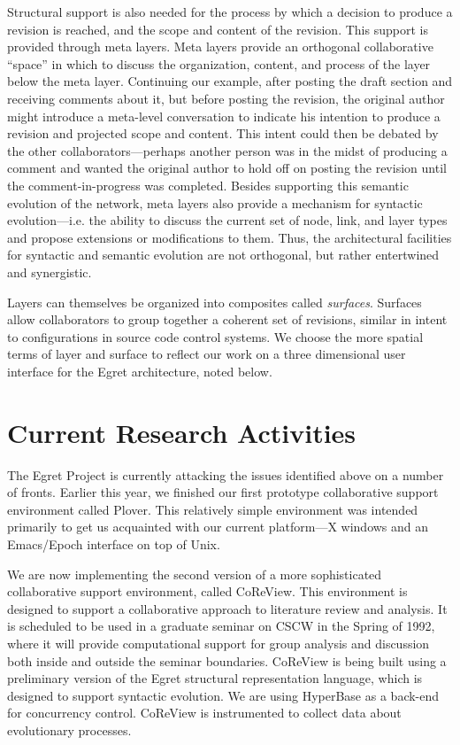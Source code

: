 Structural support is also needed for the process by which a decision
to produce a revision is reached, and the scope and content of the
revision.  This support is provided through meta layers.  Meta layers
provide an orthogonal collaborative ``space'' in which to discuss the
organization, content, and process of the layer below the meta layer.
Continuing our example, after posting the draft section and receiving
comments about it, but before posting the revision, the original
author might introduce a meta-level conversation to indicate his
intention to produce a revision and projected scope and content.  This
intent could then be debated by the other collaborators---perhaps
another person was in the midst of producing a comment and wanted the
original author to hold off on posting the revision until the
comment-in-progress was completed.  Besides supporting this semantic
evolution of the network, meta layers also provide a mechanism for
syntactic evolution---i.e. the ability to discuss the current set of
node, link, and layer types and propose extensions or modifications to
them.  Thus, the architectural facilities for syntactic and semantic
evolution are not orthogonal, but rather entertwined and synergistic.

Layers can themselves be organized into composites called {\sl
surfaces}.  Surfaces allow collaborators to group together a coherent
set of revisions, similar in intent to configurations in source code
control systems.  We choose the more spatial terms of layer and
surface to reflect our work on a three dimensional user
interface for the Egret architecture, noted below.


\section*{Current Research Activities}

The Egret Project is currently attacking the issues identified above
on a number of fronts.  Earlier this year, we finished our
first prototype collaborative support environment called Plover.
This relatively simple environment was intended primarily
to get us acquainted with our current platform---X windows and an
Emacs/Epoch interface on top of Unix.  

We are now implementing the second version of a more sophisticated
collaborative support environment, called CoReView. This environment is
designed to support a collaborative approach to literature review and
analysis.  It is scheduled to be used in a graduate seminar on CSCW
in the Spring of 1992, where it will provide
computational support for group analysis and discussion both inside
and outside the seminar boundaries.  CoReView is being built using a
preliminary version of the Egret structural representation language,
which is designed to support syntactic evolution. We are using 
HyperBase \cite{Wiil90} as a back-end for concurrency control.  CoReView is
instrumented to collect data about evolutionary processes.

